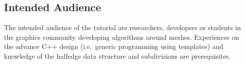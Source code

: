 \documentclass[letter]{article}
\begin{document}
\subsection*{Intended Audience}
The intended audience of the tutorial are researchers, 
developers or students in the graphics community developing 
algorithms around meshes. Experiences on the advance C++
design (i.e.\ generic programming using templates) and
knowledge of the halfedge data structure and 
subdivisions are prerequisites. 
\end{document}
